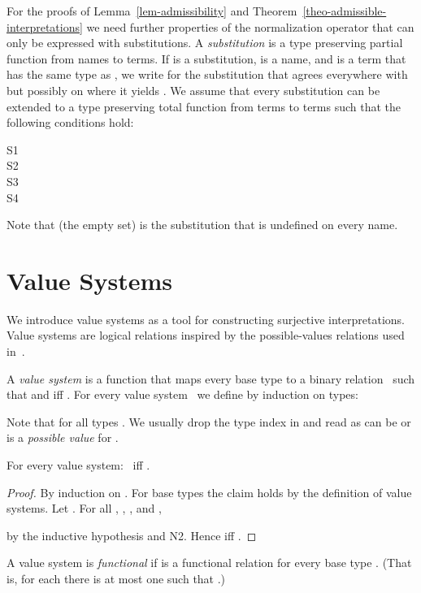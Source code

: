 For the proofs of Lemma~\ref{lem-admissibility} and
Theorem~\ref{theo-admissible-interpretations} we need
further properties of the normalization operator that
can only be expressed with substitutions.  A
\emph{substitution} is a type preserving partial
function from names to terms.  If  is a
substitution,  is a name, and  is a term that has
the same type as , we write \emph{} for the substitution that agrees everywhere
with~ but possibly on  where it yields .
We assume that every substitution  can be
extended to a type preserving total function
\emph{} from terms to terms such that the
following conditions hold:
\enlargethispage*{5mm} \begin{description}
\item[{S1}~] 
\item[{S2}~] 
\item[{S3}~] 
\item[{S4}~] 
\end{description}
Note that  (the empty set) is the substitution
that is undefined on every name.

\section{Value Systems}
\label{sec:value-sys}

We introduce value systems as a tool for constructing
surjective interpretations.  Value systems are
logical relations inspired by the possible-values
relations used
in~\cite{BrownARHO,BrownSmolkaEFO,BrownSmolkaBasic}.

A \emph{value system} is a function  that maps
every base type  to a binary
relation~ such that
 and  iff .  For every value
system~ we define by induction on types:

Note that
 for all
types .  We usually drop the type index in
 and read  as  can be
 or  is a \emph{possible value} for .

\begin{prop}
  \label{prop-norm-poss-value}
  For every value system: \
   iff .
\end{prop}

\begin{proof}
  By induction on .  For base types the claim
  holds by the definition of value systems.  Let
  .
  For all , , , and ,
  
  by the inductive hypothesis and N2.
  Hence  iff .
\end{proof}

A value system  is \emph{functional} if
 is a functional relation for every base
type .
(That is, for each  there is at most one  such that .) 

